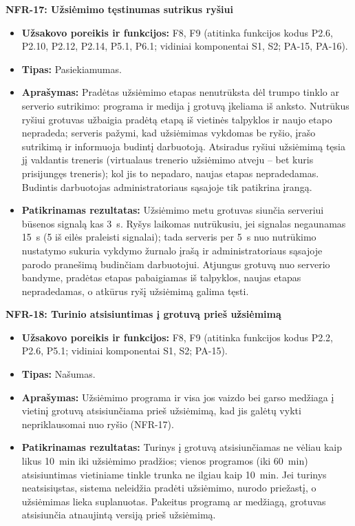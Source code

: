 \noindent\textbf{NFR-17: Užsiėmimo tęstinumas sutrikus ryšiui}
\begin{itemize}
    \item \textbf{Užsakovo poreikis ir funkcijos:} F8, F9 (atitinka funkcijos kodus P2.6, P2.10, P2.12, P2.14, P5.1, P6.1; vidiniai komponentai S1, S2; PA-15, PA-16).
    \item \textbf{Tipas:} Pasiekiamumas.
    \item \textbf{Aprašymas:} Pradėtas užsiėmimo etapas nenutrūksta dėl trumpo tinklo ar serverio sutrikimo: programa ir medija į grotuvą įkeliama iš anksto. Nutrūkus ryšiui grotuvas užbaigia pradėtą etapą iš vietinės talpyklos ir naujo etapo nepradeda; serveris pažymi, kad užsiėmimas vykdomas be ryšio, įrašo sutrikimą ir informuoja budintį darbuotoją. Atsiradus ryšiui užsiėmimą tęsia jį valdantis treneris (virtualaus trenerio užsiėmimo atveju – bet kuris prisijungęs treneris); kol jis to nepadaro, naujas etapas nepradedamas. Budintis darbuotojas administratoriaus sąsajoje tik patikrina įrangą.
    \item \textbf{Patikrinamas rezultatas:} Užsiėmimo metu grotuvas siunčia serveriui būsenos signalą kas 3~s. Ryšys laikomas nutrūkusiu, jei signalas negaunamas 15~s (5 iš eilės praleisti signalai); tada serveris per 5~s nuo nutrūkimo nustatymo sukuria vykdymo žurnalo įrašą ir administratoriaus sąsajoje parodo pranešimą budinčiam darbuotojui. Atjungus grotuvą nuo serverio bandyme, pradėtas etapas pabaigiamas iš talpyklos, naujas etapas nepradedamas, o atkūrus ryšį užsiėmimą galima tęsti.
\end{itemize}
 

\noindent\textbf{NFR-18: Turinio atsisiuntimas į grotuvą prieš užsiėmimą}
\begin{itemize}
    \item \textbf{Užsakovo poreikis ir funkcijos:} F8, F9 (atitinka funkcijos kodus P2.2, P2.6, P5.1; vidiniai komponentai S1, S2; PA-15).
    \item \textbf{Tipas:} Našumas.
    \item \textbf{Aprašymas:} Užsiėmimo programa ir visa jos vaizdo bei garso medžiaga į vietinį grotuvą atsisiunčiama prieš užsiėmimą, kad jis galėtų vykti nepriklausomai nuo ryšio (NFR-17).
    \item \textbf{Patikrinamas rezultatas:} Turinys į grotuvą atsisiunčiamas ne vėliau kaip likus 10~min iki užsiėmimo pradžios; vienos programos (iki 60~min) atsisiuntimas vietiniame tinkle trunka ne ilgiau kaip 10~min. Jei turinys neatsisiųstas, sistema neleidžia pradėti užsiėmimo, nurodo priežastį, o užsiėmimas lieka suplanuotas. Pakeitus programą ar medžiagą, grotuvas atsisiunčia atnaujintą versiją prieš užsiėmimą.
\end{itemize}

